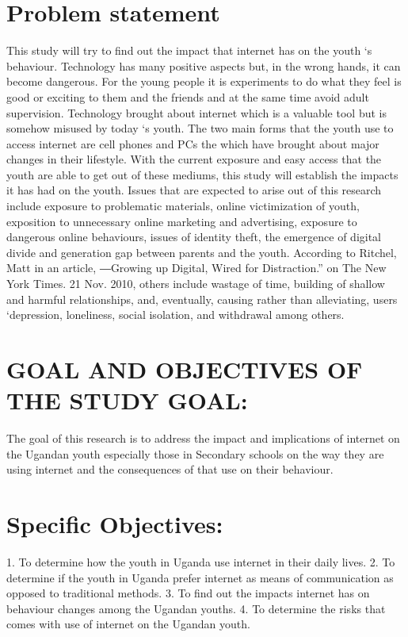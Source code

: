 \documentclass[10pt,letterpaper]{article}
\begin{document}
\section{Problem statement }
 This study will try to find out the impact that internet has on the youth ‘s behaviour. Technology has many positive aspects but, in the wrong hands, it can become dangerous. For the young people it is experiments to do what they feel is good or exciting to them and the friends and at the same time avoid adult supervision.  Technology brought about internet which is a valuable tool but is somehow misused by today ‘s youth. The two main forms that the youth use to access internet are cell phones and PCs the which have brought about major changes in their lifestyle. With the current exposure and easy access that the youth are able to get out of these mediums, this study will establish the impacts it has had on the youth. Issues that are expected to arise out of this research include exposure to problematic materials, online victimization of youth, exposition to unnecessary online marketing and advertising, exposure to dangerous online behaviours, issues of identity theft, the emergence of digital divide and generation gap between parents and the youth. According to Ritchel, Matt in an article, ―Growing up Digital, Wired for Distraction.” on The New York Times. 21 Nov. 2010, others include wastage of time, building of shallow and harmful relationships, and, eventually, causing rather than alleviating, users ‘depression, loneliness, social isolation, and withdrawal among others.
\section{GOAL AND OBJECTIVES OF THE STUDY GOAL:}
 The goal of this research is to address the impact and implications of internet on the Ugandan youth especially those in Secondary schools on the way they are using internet and the consequences of that use on their behaviour. 
\section{Specific Objectives: }
1. To determine how the youth in Uganda use internet in their daily lives. 
2. To determine if the youth in Uganda prefer internet as means of communication as opposed       to traditional methods. 
3. To find out the impacts internet has on behaviour changes among the Ugandan youths.
 4. To determine the risks that comes with use of internet on the Ugandan youth.
\end{document}
